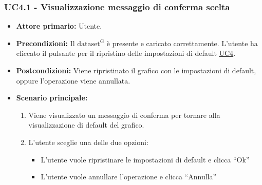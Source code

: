 \subsubsection{UC4.1 - Visualizzazione messaggio di conferma scelta}
\label{sec:UC4.1}
\begin{itemize}
	\item \textbf{Attore primario:} Utente.
	\item \textbf{Precondizioni:} Il ${\mathrm{dataset^{G}}}$ è presente e caricato correttamente. L'utente ha cliccato il pulsante per il ripristino delle impostazioni di default \hyperref[sec:UC4]{UC4}.
	\item \textbf{Postcondizioni:} Viene ripristinato il grafico con le impostazioni di default, oppure l'operazione viene annullata.
	\item \textbf{Scenario principale:}
		\begin{enumerate}
		\item Viene visualizzato un messaggio di conferma per tornare alla visualizzazione di default del grafico.
		\item L'utente sceglie una delle due opzioni:
			\begin{itemize}
				\item L'utente vuole ripristinare le impostazioni di default e clicca ``Ok''
				\item L'utente vuole annullare l'operazione e clicca ``Annulla''
			\end{itemize}
		\end{enumerate}
\end{itemize}

\newpage


